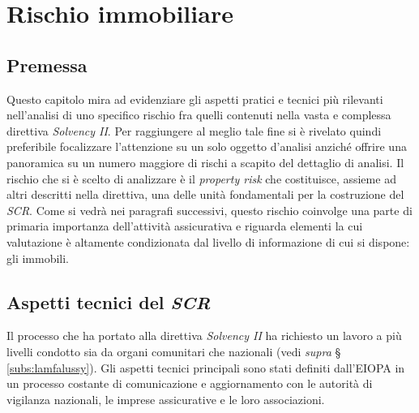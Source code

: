 \chapter{Rischio immobiliare}
\label{chap:secondo}
\section{Premessa}
\label{sec:prem}
Questo capitolo mira ad evidenziare gli aspetti pratici e tecnici più rilevanti nell'analisi di uno specifico rischio fra quelli contenuti nella vasta e complessa direttiva {\itshape Solvency II}. Per raggiungere al meglio tale fine si è rivelato quindi preferibile focalizzare l'attenzione su un solo oggetto d'analisi anziché offrire una panoramica su un numero maggiore di rischi a scapito del dettaglio di analisi.
Il rischio che si è scelto di analizzare è il {\itshape property risk} che costituisce, assieme ad altri descritti nella direttiva, una delle unità fondamentali per la costruzione del {\itshape SCR}. 
Come si vedrà nei paragrafi successivi, questo rischio coinvolge una parte di primaria importanza dell'attività assicurativa e riguarda elementi la cui valutazione è altamente condizionata dal livello di informazione di cui si dispone: gli immobili.
\section{Aspetti tecnici del {\itshape SCR}}
Il processo che ha portato alla direttiva {\itshape Solvency II} ha richiesto un lavoro a più livelli condotto sia da organi comunitari che nazionali (vedi \textit{supra} § \ref{subs:lamfalussy}). Gli aspetti tecnici principali sono stati definiti dall'EIOPA in un processo costante di comunicazione e aggiornamento con le autorità di vigilanza nazionali, le imprese assicurative e le loro associazioni.

